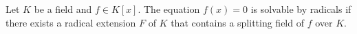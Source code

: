 Let $K$ be a field and $f \in K[x]$. The equation $f(x) = 0$ is solvable by radicals if there exists a radical extension $F$ of $K$ that contains a splitting field of $f$ over $K$.
